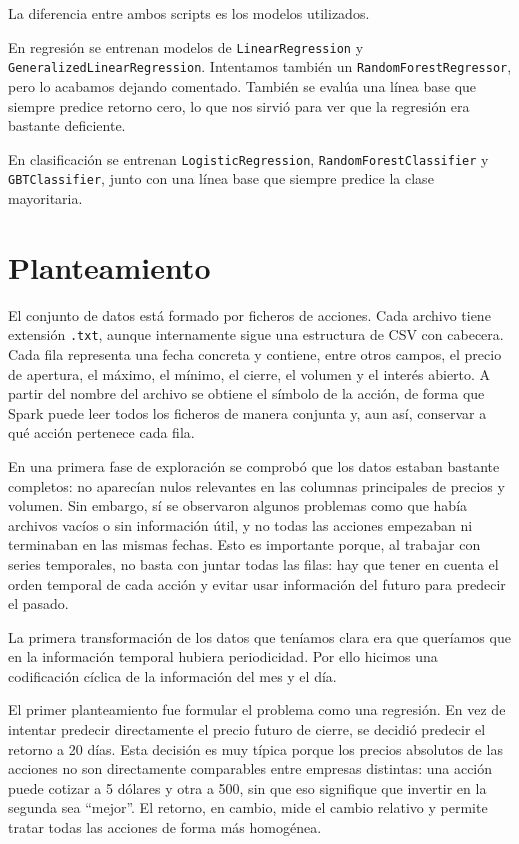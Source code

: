 \documentclass[runningheads]{llncs}
\begin{document}
La diferencia entre ambos scripts es los modelos utilizados.

En regresión se entrenan modelos de \texttt{LinearRegression} y \texttt{GeneralizedLinearRegression}. Intentamos también un \texttt{RandomForestRegressor}, pero lo acabamos dejando comentado. También se evalúa una línea base que siempre predice retorno cero, lo que nos sirvió para ver que la regresión era bastante deficiente.

En clasificación se entrenan \texttt{LogisticRegression}, \texttt{RandomForestClassifier} y \texttt{GBTClassifier}, junto con una línea base que siempre predice la clase mayoritaria.

\section{Planteamiento}

El conjunto de datos está formado por ficheros de acciones. Cada archivo tiene extensión \texttt{.txt}, aunque internamente sigue una estructura de CSV con cabecera. Cada fila representa una fecha concreta y contiene, entre otros campos, el precio de apertura, el máximo, el mínimo, el cierre, el volumen y el interés abierto. A partir del nombre del archivo se obtiene el símbolo de la acción, de forma que Spark puede leer todos los ficheros de manera conjunta y, aun así, conservar a qué acción pertenece cada fila.

En una primera fase de exploración se comprobó que los datos estaban bastante completos: no aparecían nulos relevantes en las columnas principales de precios y volumen. Sin embargo, sí se observaron algunos problemas como que había archivos vacíos o sin información útil, y no todas las acciones empezaban ni terminaban en las mismas fechas. Esto es importante porque, al trabajar con series temporales, no basta con juntar todas las filas: hay que tener en cuenta el orden temporal de cada acción y evitar usar información del futuro para predecir el pasado.

La primera transformación de los datos que teníamos clara era que queríamos que en la información temporal hubiera periodicidad. Por ello hicimos una codificación cíclica de la información del mes y el día.

El primer planteamiento fue formular el problema como una regresión. En vez de intentar predecir directamente el precio futuro de cierre, se decidió predecir el retorno a 20 días. Esta decisión es muy típica porque los precios absolutos de las acciones no son directamente comparables entre empresas distintas: una acción puede cotizar a 5 dólares y otra a 500, sin que eso signifique que invertir en la segunda sea ``mejor''. El retorno, en cambio, mide el cambio relativo y permite tratar todas las acciones de forma más homogénea.
\end{document}
